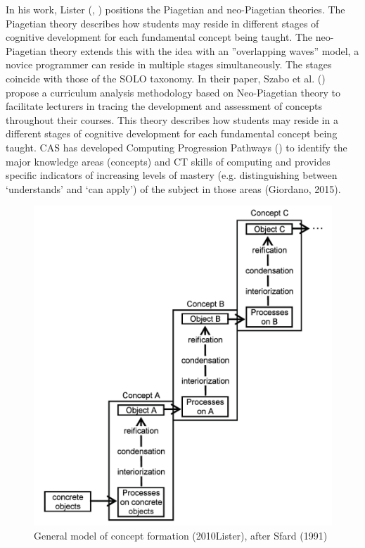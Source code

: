 In his work, Lister (\cite{lister2010naturally}, \cite{lister2016toward}) positions the Piagetian and neo-Piagetian theories. The Piagetian theory describes how students may reside in different stages of cognitive development for each fundamental concept being taught. The neo-Piagetian theory extends this with the idea with an ”overlapping waves” model, a novice programmer can reside in multiple stages simultaneously. The stages coincide with those of the SOLO taxonomy. In their paper, Szabo et al. (\cite{szabo2014neo}) propose a curriculum analysis methodology based on Neo-Piagetian theory to facilitate lecturers in tracing the development and assessment of concepts throughout their courses. This theory describes how students may reside in a different stages of cognitive development for each fundamental concept being taught. CAS has developed Computing Progression Pathways (\cite{Dorling2014CTprogressions}) to identify the major knowledge areas (concepts) and CT skills of computing and provides specific indicators of increasing levels of mastery (e.g. distinguishing between ‘understands’ and ‘can apply’) of the subject in those areas (\cite{Giordano2015}Giordano, 2015). 

\begin{figure}
\includegraphics[scale=0.8]{figures/ListerFases.png}
\caption{General model of concept formation (2010Lister), after Sfard (1991)}\label{fig:ListerFases}
\end{figure}

